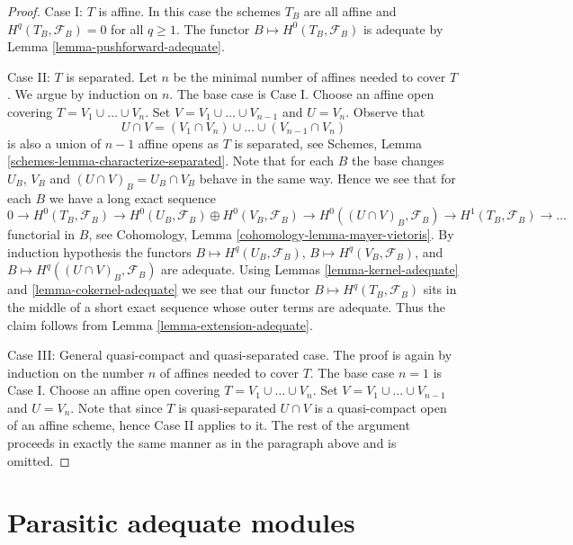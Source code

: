 \documentclass{stacks-project}
\theoremstyle{plain}
\theoremstyle{definition}
\theoremstyle{remark}
\numberwithin{equation}{subsection}
\begin{document}
\begin{proof}
\medskip\noindent
Case I: $T$ is affine. In this case the schemes $T_B$ are all affine
and $H^q(T_B, \mathcal{F}_B) = 0$ for all $q \geq 1$.
The functor $B \mapsto H^0(T_B, \mathcal{F}_B)$ is adequate by
Lemma \ref{lemma-pushforward-adequate}.

\medskip\noindent
Case II: $T$ is separated. Let $n$ be the minimal number of affines needed
to cover $T$. We argue by induction on $n$. The base case is Case I.
Choose an affine open covering $T = V_1 \cup \ldots \cup V_n$.
Set $V = V_1 \cup \ldots \cup V_{n - 1}$ and $U = V_n$. Observe that
$$
U \cap V = (V_1 \cap V_n) \cup \ldots \cup (V_{n - 1} \cap V_n)
$$
is also a union of $n - 1$ affine opens as $T$ is separated, see
Schemes, Lemma \ref{schemes-lemma-characterize-separated}.
Note that for each $B$ the base changes $U_B$, $V_B$ and
$(U \cap V)_B = U_B \cap V_B$ behave in the same way. Hence we see that
for each $B$ we have a long exact sequence
$$
0 \to
H^0(T_B, \mathcal{F}_B) \to
H^0(U_B, \mathcal{F}_B) \oplus H^0(V_B, \mathcal{F}_B) \to
H^0((U \cap V)_B, \mathcal{F}_B) \to
H^1(T_B, \mathcal{F}_B) \to \ldots
$$
functorial in $B$, see
Cohomology, Lemma \ref{cohomology-lemma-mayer-vietoris}.
By induction hypothesis the functors
$B \mapsto H^q(U_B, \mathcal{F}_B)$,
$B \mapsto H^q(V_B, \mathcal{F}_B)$, and
$B \mapsto H^q((U \cap V)_B, \mathcal{F}_B)$
are adequate. Using
Lemmas \ref{lemma-kernel-adequate} and
\ref{lemma-cokernel-adequate}
we see that our functor $B \mapsto H^q(T_B, \mathcal{F}_B)$ sits in the
middle of a short exact sequence whose outer terms are adequate.
Thus the claim follows from
Lemma \ref{lemma-extension-adequate}.

\medskip\noindent
Case III: General quasi-compact and quasi-separated case.
The proof is again by induction on the number $n$ of affines needed to
cover $T$. The base case $n = 1$ is Case I.
Choose an affine open covering $T = V_1 \cup \ldots \cup V_n$.
Set $V = V_1 \cup \ldots \cup V_{n - 1}$ and $U = V_n$. Note that
since $T$ is quasi-separated $U \cap V$ is a quasi-compact open of an
affine scheme, hence Case II applies to it. The rest of the argument
proceeds in exactly the same manner as in the paragraph above and is
omitted.
\end{proof}







\section{Parasitic adequate modules}
\label{section-parasitic}
\end{document}
